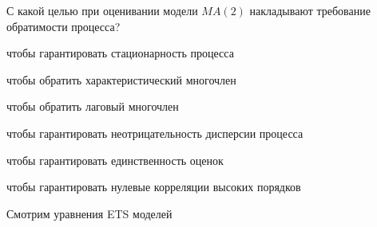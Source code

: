 
\begin{question}
С какой целью при оценивании модели \(MA(2)\) накладывают требование обратимости процесса?
\begin{answerlist}
  \item чтобы гарантировать стационарность процесса
  \item чтобы обратить характеристический многочлен
  \item чтобы обратить лаговый многочлен
  \item чтобы гарантировать неотрицательность дисперсии процесса
  \item чтобы гарантировать единственность оценок
  \item чтобы гарантировать нулевые корреляции высоких порядков
\end{answerlist}
\end{question}

\begin{solution}
Смотрим уравнения ETS моделей
\end{solution}

